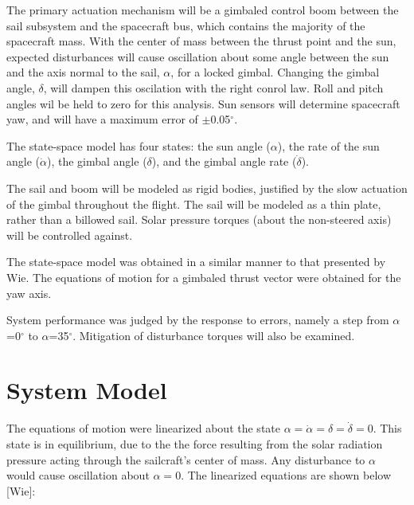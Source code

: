 \documentclass[]{aiaa-tc}%
\begin{document}
The primary actuation mechanism will be a gimbaled control boom between the sail subsystem and the spacecraft bus, which contains the majority of the spacecraft mass.  With the center of mass between the thrust point and the sun, expected disturbances will cause oscillation about some angle between the sun and the axis normal to the sail, $\alpha$, for a locked gimbal.  Changing the gimbal angle, $\delta$, will dampen this oscilation with the right conrol law. Roll and pitch angles wil be held to zero for this analysis. Sun sensors will determine spacecraft yaw, and will have a maximum error of $\pm$0.05$^{\circ}$.
	
	\vspace{5 mm}

The state-space model has four states: the sun angle ($\alpha$), the rate of the sun angle ($\dot{\alpha}$), the gimbal angle ($\delta$), and the gimbal angle rate ($\dot{\delta}$). 
	
	\vspace{5 mm}

The sail and boom will be modeled as rigid bodies, justified by the slow actuation of the gimbal throughout the flight. The sail will be modeled as a thin plate, rather than a billowed sail. Solar pressure torques (about the non-steered axis) will be controlled against. 
	\vspace{5 mm}

The state-space model was obtained in a similar manner to that presented by Wie. The equations of motion for a gimbaled thrust vector were obtained for the yaw axis. 
	
	\vspace{5 mm}

System performance was judged by the response to errors, namely a step from $\alpha$=0$^{\circ}$ to $\alpha$=35$^{\circ}$. Mitigation of disturbance torques will also be examined.

	\section{System Model}

	The equations of motion were linearized about the state $\alpha = \dot{\alpha} = \delta = \dot{\delta} =0$. This state is in equilibrium, due to the the force resulting from the solar radiation pressure acting through the sailcraft's center of mass.  Any disturbance to $\alpha$ would cause oscillation about $\alpha=0$. The linearized equations are shown below [Wie]:
\end{document}
